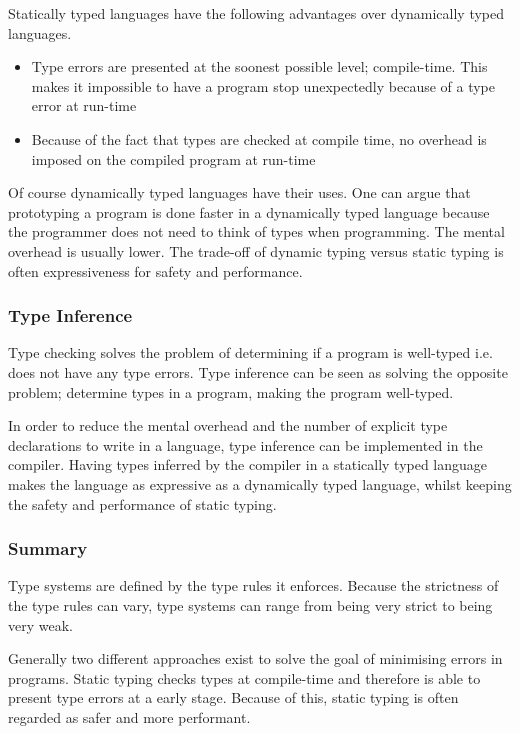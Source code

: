 Statically typed languages have the following advantages over dynamically typed languages.

\begin{itemize}
  \item Type errors are presented at the soonest possible level; compile-time. This makes it impossible to have a program stop unexpectedly because of a type error at run-time
  \item Because of the fact that types are checked at compile time, no overhead is imposed on the compiled program at run-time
\end{itemize}

Of course dynamically typed languages have their uses. One can argue that prototyping a program is done faster in a dynamically typed language because the programmer does not need to think of types when programming. The mental overhead is usually lower. The trade-off of dynamic typing versus static typing is often expressiveness for safety and performance. 

\subsubsection{Type Inference}
Type checking solves the problem of determining if a program is well-typed i.e. does not have any type errors. Type inference can be seen as solving the opposite problem; determine types in a program, making the program well-typed.

In order to reduce the mental overhead and the number of explicit type declarations to write in a language, type inference can be implemented in the compiler. Having types inferred by the compiler in a statically typed language makes the language as expressive as a dynamically typed language, whilst keeping the safety and performance of static typing.

\subsubsection{Summary}
Type systems are defined by the type rules it enforces. Because the strictness of the type rules can vary, type systems can range from being very strict to being very weak.

Generally two different approaches exist to solve the goal of minimising errors in programs. Static typing checks types at compile-time and therefore is able to present type errors at a early stage. Because of this, static typing is often regarded as safer and more performant.

